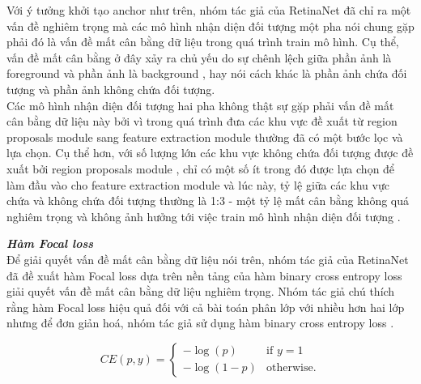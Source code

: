 {    \noindent
    Với ý tưởng khởi tạo anchor  như trên, nhóm tác giả của RetinaNet  đã chỉ ra một vấn đề nghiêm trọng mà các mô hình nhận diện đối tượng  một pha  nói chung gặp phải đó là vấn đề mất cân bằng dữ liệu  trong quá trình train mô hình.
    Cụ thể, vấn đề mất cân bằng ở đây xảy ra chủ yếu do sự chênh lệch giữa phần ảnh là foreground  và phần ảnh là background , hay nói cách khác là phần ảnh chứa đối tượng và phần ảnh không chứa đối tượng. \\
    Các mô hình nhận diện đối tượng  hai pha  không thật sự gặp phải vấn đề mất cân bằng dữ liệu  này bởi vì trong quá trình đưa các khu vực đề xuất từ region proposals module  sang feature extraction module  thường đã có một bước lọc và lựa chọn.
    Cụ thể hơn, với số lượng lớn các khu vực không chứa đối tượng được đề xuất bởi region proposals module , chỉ có một số ít trong đó được lựa chọn để làm đầu vào cho feature extraction module  và lúc này, tỷ lệ giữa các khu vực chứa và không chứa đối tượng thường là 1:3 - một tỷ lệ mất cân bằng không quá nghiêm trọng và không ảnh hưởng tới việc train mô hình nhận diện đối tượng .

    \noindent
    \textbf{\textit{Hàm Focal loss }} \\
    Để giải quyết vấn đề mất cân bằng dữ liệu  nói trên, nhóm tác giả của RetinaNet  đã đề xuất hàm Focal loss  dựa trên nền tảng của hàm binary cross entropy loss  giải quyết vấn đề mất cân bằng dữ liệu  nghiêm trọng.
    Nhóm tác giả chú thích rằng hàm Focal loss  hiệu quả đối với cả bài toán phân lớp với nhiều hơn hai lớp nhưng để đơn giản hoá, nhóm tác giả sử dụng hàm binary cross entropy loss .

    \begin{equation}
        \label{eq:bce}
        CE(p,y) = 
        \begin{cases}
            -\log(p) &\text{if $y = 1$} \\
            -\log (1 - p) &\text{otherwise.}
        \end{cases}
    \end{equation}

}

